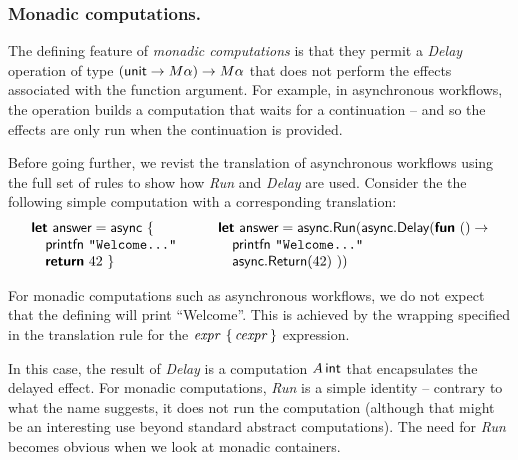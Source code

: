 \documentclass[runningheads,a4paper]{llncs}
\begin{document}
\vspace{-1em}
\subsubsection{Monadic computations.} The defining feature of \emph{monadic computations}
is that they permit a \emph{Delay} operation of type $(\textnormal{\sffamily unit} \rightarrow M\alpha) \rightarrow M\alpha$
that does not perform the effects associated with the function argument.
For example, in asynchronous workflows, the operation builds 
a computation that waits for a continuation -- and so the effects are only run when the continuation
is provided.

Before going further, we revist the translation of asynchronous workflows using the full set of
rules to show how \emph{Run} and \emph{Delay} are used. Consider the the following simple computation
with a corresponding translation:
%
\begin{equation*}
\begin{array}{l}
\kvd{let}~\ident{answer} = \ident{async}~\{\\
\quad \ident{printfn}~ \texttt{"Welcome..."}\\
\quad \kvd{return}~ 42 ~\}
\end{array}
\qquad
\begin{array}{l}
\kvd{let}~\ident{answer} = \ident{async}.\ident{Run}(\ident{async}.\ident{Delay}(\kvd{fun}~()\rightarrow\\
\quad \ident{printfn}~ \texttt{"Welcome..."}\\
\quad \ident{async}.\ident{Return}(42)~))
\end{array}
\end{equation*}

For monadic computations such as asynchronous workflows, we do not expect that the defining
 will print ``Welcome''. This is achieved by the wrapping specified in the 
translation rule for the $\textnormal{\emph{expr}}~\{\,\textnormal{\emph{cexpr}}\,\}$ expression. 

In this case, the result of \emph{Delay} is a computation $A\,\textnormal{\sffamily int}$ that encapsulates the
delayed effect. For monadic computations, \emph{Run} is a simple identity -- contrary
to what the name suggests, it does not run the computation (although that might be an interesting
use beyond standard abstract computations). The need for \emph{Run} becomes obvious when we look
at monadic containers.

\vspace{-1em}
\end{document}
